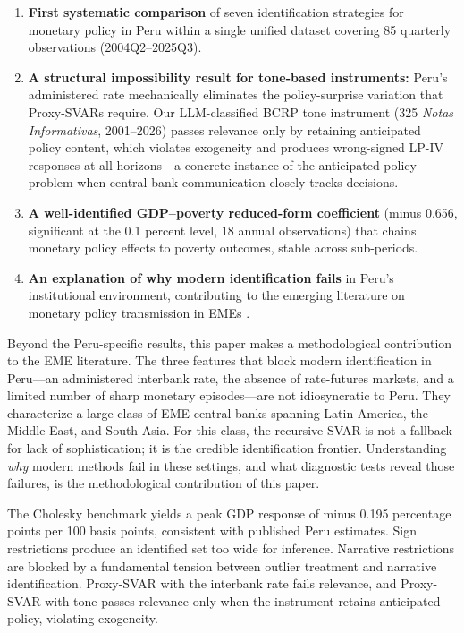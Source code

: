 \documentclass[12pt,letterpaper]{article}
\begin{document}
\begin{enumerate}
  \item \textbf{First systematic comparison} of seven identification
    strategies for monetary policy in Peru within a single unified dataset
    covering 85 quarterly observations (2004Q2--2025Q3).

  \item \textbf{A structural impossibility result for tone-based instruments:}
    Peru's administered rate mechanically eliminates the policy-surprise
    variation that Proxy-SVARs require. Our LLM-classified BCRP tone
    instrument (325 \textit{Notas Informativas}, 2001--2026) passes
    relevance only by retaining anticipated policy content, which violates
    exogeneity and produces wrong-signed LP-IV responses at all horizons---a
    concrete instance of the anticipated-policy problem when central bank
    communication closely tracks decisions.

  \item \textbf{A well-identified GDP--poverty reduced-form coefficient}
    (minus 0.656, significant at the 0.1 percent level, 18 annual
    observations) that chains monetary policy effects to poverty outcomes,
    stable across sub-periods.

  \item \textbf{An explanation of why modern identification fails} in Peru's
    institutional environment, contributing to the emerging literature on
    monetary policy transmission in EMEs \citep{ha2025}.
\end{enumerate}

Beyond the Peru-specific results, this paper makes a methodological
contribution to the EME literature. The three features that block modern
identification in Peru---an administered interbank rate, the absence of
rate-futures markets, and a limited number of sharp monetary
episodes---are not idiosyncratic to Peru. They characterize a large class
of EME central banks spanning Latin America, the Middle East, and South
Asia. For this class, the recursive SVAR is not a fallback for lack of
sophistication; it is the credible identification frontier. Understanding
\emph{why} modern methods fail in these settings, and what diagnostic
tests reveal those failures, is the methodological contribution of this
paper.

The Cholesky benchmark yields a peak GDP response of minus 0.195
percentage points per 100 basis points, consistent with published Peru
estimates. Sign restrictions produce an identified set too wide for
inference. Narrative restrictions are blocked by a fundamental tension
between outlier treatment and narrative identification. Proxy-SVAR with
the interbank rate fails relevance, and Proxy-SVAR with tone passes
relevance only when the instrument retains anticipated policy, violating
exogeneity.
\end{document}

